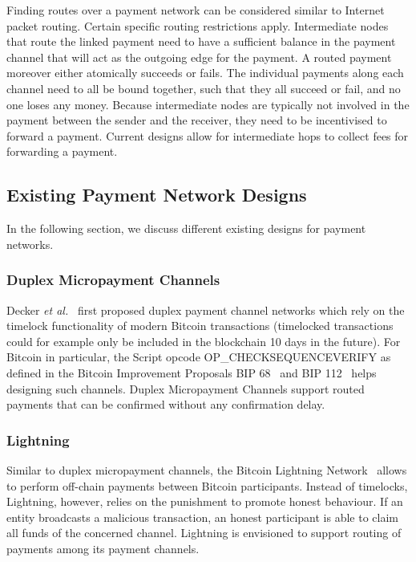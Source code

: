 \documentclass[sigconf]{acmart}
\begin{document}
Finding routes over a payment network can be considered similar to Internet packet routing. Certain specific routing restrictions apply. Intermediate nodes that route the linked payment need to have a sufficient balance in the payment channel that will act as the outgoing edge for the payment. A routed payment moreover either atomically succeeds or fails. The individual payments along each channel need to all be bound together, such that they all succeed or fail, and no one loses any money. Because intermediate nodes are typically not involved in the payment between the sender and the receiver, they need to be incentivised to forward a payment. Current designs allow for intermediate hops to collect fees for forwarding a payment.

\subsection{Existing Payment Network Designs}
In the following section, we discuss different existing designs for payment networks.

\subsubsection{Duplex Micropayment Channels}
Decker \emph{et al.}~\cite{decker2015fast} first proposed duplex payment channel networks which rely on the timelock functionality of modern Bitcoin transactions (timelocked transactions could for example only be included in the blockchain 10 days in the future). For Bitcoin in particular, the Script opcode OP\_CHECKSEQUENCEVERIFY as defined in the Bitcoin Improvement Proposals BIP 68~\cite{bip68} and BIP 112~\cite{bip112} helps designing such channels. Duplex Micropayment Channels support routed payments that can be confirmed without any confirmation delay.

\subsubsection{Lightning}
Similar to duplex micropayment channels, the Bitcoin Lightning Network~\cite{lightning} allows to perform off-chain payments between Bitcoin participants. Instead of timelocks, Lightning, however, relies on the punishment to promote honest behaviour. If an entity broadcasts a malicious transaction, an honest participant is able to claim all funds of the concerned channel. Lightning is envisioned to support routing of payments among its payment channels.
\end{document}
